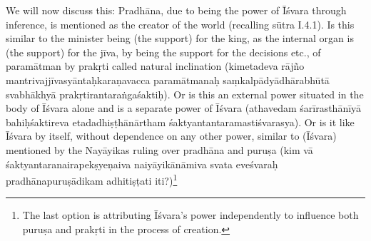 
We will now discuss this: Pradhāna, due to being the power of Īśvara through inference, is mentioned as the creator of the world (recalling sūtra I.4.1). Is this similar to the minister being (the support) for the king, as the internal organ is (the support) for the jīva, by being the support for the decisions etc., of paramātman by prakṛti called natural inclination (kimetadeva rājño mantrivajjīvasyāntaḥkaraṇavacca paramātmanaḥ saṃkalpādyādhārabhūtā svabhākhyā prakṛtirantaraṅgaśaktiḥ). Or is this an external power situated in the body of Īśvara alone and is a separate power of Īśvara (athavedam śarīrasthānīyā bahiḥ\-śaktireva etadadhiṣṭhānārtham śaktyantantaramastiśvarasya). Or is it like Īśvara by itself, without dependence on any other power, similar to (Īśvara) mentioned by the Nayāyikas ruling over pradhāna and puruṣa (kim vā śaktyantaranairapekṣyeṇaiva naiyāyikānāmiva svata eveśvaraḥ pradhānapuruṣādikam adhitiṣṭati iti?)\footnote{The last option is attributing Īśvara’s power independently to influence both puruṣa and prakṛti in the process of creation.}

